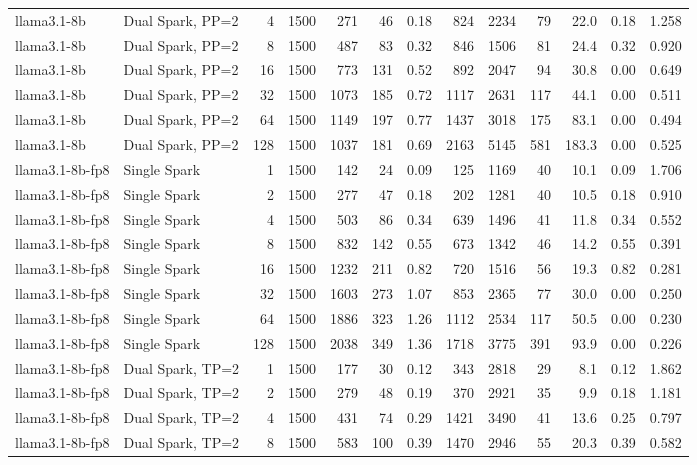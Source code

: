 \begin{tabular}{l l r r r r r r r r r r r}
llama3.1-8b & Dual Spark, PP=2 & 4 & 1500 & 271 & 46 & 0.18 & 824 & 2234 & 79 & 22.0 & 0.18 & 1.258 \\
llama3.1-8b & Dual Spark, PP=2 & 8 & 1500 & 487 & 83 & 0.32 & 846 & 1506 & 81 & 24.4 & 0.32 & 0.920 \\
llama3.1-8b & Dual Spark, PP=2 & 16 & 1500 & 773 & 131 & 0.52 & 892 & 2047 & 94 & 30.8 & 0.00 & 0.649 \\
llama3.1-8b & Dual Spark, PP=2 & 32 & 1500 & 1073 & 185 & 0.72 & 1117 & 2631 & 117 & 44.1 & 0.00 & 0.511 \\
llama3.1-8b & Dual Spark, PP=2 & 64 & 1500 & 1149 & 197 & 0.77 & 1437 & 3018 & 175 & 83.1 & 0.00 & 0.494 \\
llama3.1-8b & Dual Spark, PP=2 & 128 & 1500 & 1037 & 181 & 0.69 & 2163 & 5145 & 581 & 183.3 & 0.00 & 0.525 \\
\addlinespace
llama3.1-8b-fp8 & Single Spark & 1 & 1500 & 142 & 24 & 0.09 & 125 & 1169 & 40 & 10.1 & 0.09 & 1.706 \\
llama3.1-8b-fp8 & Single Spark & 2 & 1500 & 277 & 47 & 0.18 & 202 & 1281 & 40 & 10.5 & 0.18 & 0.910 \\
llama3.1-8b-fp8 & Single Spark & 4 & 1500 & 503 & 86 & 0.34 & 639 & 1496 & 41 & 11.8 & 0.34 & 0.552 \\
llama3.1-8b-fp8 & Single Spark & 8 & 1500 & 832 & 142 & 0.55 & 673 & 1342 & 46 & 14.2 & 0.55 & 0.391 \\
llama3.1-8b-fp8 & Single Spark & 16 & 1500 & 1232 & 211 & 0.82 & 720 & 1516 & 56 & 19.3 & 0.82 & 0.281 \\
llama3.1-8b-fp8 & Single Spark & 32 & 1500 & 1603 & 273 & 1.07 & 853 & 2365 & 77 & 30.0 & 0.00 & 0.250 \\
llama3.1-8b-fp8 & Single Spark & 64 & 1500 & 1886 & 323 & 1.26 & 1112 & 2534 & 117 & 50.5 & 0.00 & 0.230 \\
llama3.1-8b-fp8 & Single Spark & 128 & 1500 & 2038 & 349 & 1.36 & 1718 & 3775 & 391 & 93.9 & 0.00 & 0.226 \\
\addlinespace
llama3.1-8b-fp8 & Dual Spark, TP=2 & 1 & 1500 & 177 & 30 & 0.12 & 343 & 2818 & 29 & 8.1 & 0.12 & 1.862 \\
llama3.1-8b-fp8 & Dual Spark, TP=2 & 2 & 1500 & 279 & 48 & 0.19 & 370 & 2921 & 35 & 9.9 & 0.18 & 1.181 \\
llama3.1-8b-fp8 & Dual Spark, TP=2 & 4 & 1500 & 431 & 74 & 0.29 & 1421 & 3490 & 41 & 13.6 & 0.25 & 0.797 \\
llama3.1-8b-fp8 & Dual Spark, TP=2 & 8 & 1500 & 583 & 100 & 0.39 & 1470 & 2946 & 55 & 20.3 & 0.39 & 0.582 \\

\end{tabular}
